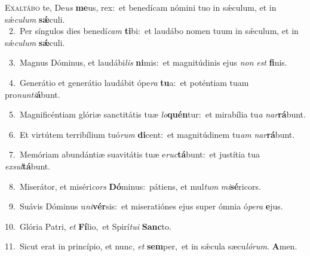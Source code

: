 \lettrine{\initial\textcolor{\initialcolor}{E}}{xaltábo} te, De\textit{us} \textbf{me}\-us, rex:~\star et benedícam nómini tuo in sǽculum, et in sǽ\-\textit{cu}\-\textit{lum} \textbf{sǽ}\-culi.\\
{\numbfont\textcolor{\numbcolor}{~2.}}~Per síngulos dies benedí\textit{cam} \textbf{ti}\-bi:~\star et laudábo nomen tuum in sǽculum, et in sǽ\-\textit{cu}\-\textit{lum} \textbf{sǽ}\-culi.\par
{\numbfont\textcolor{\numbcolor}{~3.}}~Magnus Dóminus, et laudábi\textit{lis} \textbf{ni}\-mis:~\star et magnitúdinis ejus \textit{non} \textit{est} \textbf{fi}\-nis.\par
{\numbfont\textcolor{\numbcolor}{~4.}}~Generátio et generátio laudábit ópe\textit{ra} \textbf{tu}\-a:~\star et poténtiam tuam pro\-\textit{nun}\-\textit{ti}\textbf{á}bunt.\par
{\numbfont\textcolor{\numbcolor}{~5.}}~Magnificéntiam glóriæ sanctitátis tuæ \textit{lo}\-\textbf{quén}tur:~\star et mirabília tu\textit{a} \textit{nar}\-\textbf{rá}bunt.\par
{\numbfont\textcolor{\numbcolor}{~6.}}~Et virtútem terribílium tuó\textit{rum} \textbf{di}\-cent:~\star et magnitúdinem tu\textit{am} \textit{nar}\-\textbf{rá}bunt.\par
{\numbfont\textcolor{\numbcolor}{~7.}}~Memóriam abundántiæ suavitátis tuæ e\-\textit{ruc}\-\textbf{tá}bunt:~\star et justítia tua \textit{ex}\-\textit{sul}\textbf{tá}bunt.\par
{\numbfont\textcolor{\numbcolor}{~8.}}~Miserátor, et miséri\textit{cors} \textbf{Dó}\-minus:~\star pátiens, et mul\textit{tum} \textit{mi}\-\textbf{sé}ricors.\par
{\numbfont\textcolor{\numbcolor}{~9.}}~Suávis Dóminus u\-\textit{ni}\-\textbf{vér}sis:~\star et miseratiónes ejus super ómnia ó\-\textit{pe}\-\textit{ra} \textbf{e}\-jus.\par
{\numbfont\textcolor{\numbcolor}{10.}}~Glória Patri, \textit{et} \textbf{Fí}\-lio,~\star et Spirí\-\textit{tu}\-\textit{i} \textbf{Sanc}\-to.\par
{\numbfont\textcolor{\numbcolor}{11.}}~Sicut erat in princípio, et nunc, \textit{et} \textbf{sem}\-per,~\star et in sǽcula sæcu\-\textit{ló}\-\textit{rum}. \textbf{A}\-men.\par
